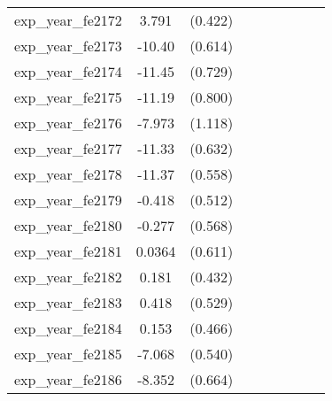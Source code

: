 {\begin{tabular}{l*{4}{cc}}
exp\_year\_fe2172&    3.791\sym{***}&  (0.422)&                  &         &                  &         &                  &         \\
exp\_year\_fe2173&   -10.40\sym{***}&  (0.614)&                  &         &                  &         &                  &         \\
exp\_year\_fe2174&   -11.45\sym{***}&  (0.729)&                  &         &                  &         &                  &         \\
exp\_year\_fe2175&   -11.19\sym{***}&  (0.800)&                  &         &                  &         &                  &         \\
exp\_year\_fe2176&   -7.973\sym{***}&  (1.118)&                  &         &                  &         &                  &         \\
exp\_year\_fe2177&   -11.33\sym{***}&  (0.632)&                  &         &                  &         &                  &         \\
exp\_year\_fe2178&   -11.37\sym{***}&  (0.558)&                  &         &                  &         &                  &         \\
exp\_year\_fe2179&   -0.418         &  (0.512)&                  &         &                  &         &                  &         \\
exp\_year\_fe2180&   -0.277         &  (0.568)&                  &         &                  &         &                  &         \\
exp\_year\_fe2181&   0.0364         &  (0.611)&                  &         &                  &         &                  &         \\
exp\_year\_fe2182&    0.181         &  (0.432)&                  &         &                  &         &                  &         \\
exp\_year\_fe2183&    0.418         &  (0.529)&                  &         &                  &         &                  &         \\
exp\_year\_fe2184&    0.153         &  (0.466)&                  &         &                  &         &                  &         \\
exp\_year\_fe2185&   -7.068\sym{***}&  (0.540)&                  &         &                  &         &                  &         \\
exp\_year\_fe2186&   -8.352\sym{***}&  (0.664)&                  &         &                  &         &                  &         \\

\end{tabular}}
